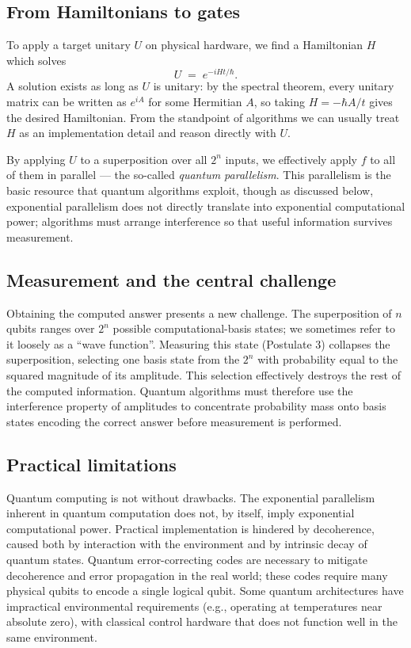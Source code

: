 \subsection{From Hamiltonians to gates}

To apply a target unitary $U$ on physical hardware, we find a Hamiltonian $H$ which solves
\begin{equation}
U \;=\; e^{-iHt/\hbar}.
\label{eq:U-from-H}
\end{equation}
A solution exists as long as $U$ is unitary: by the spectral theorem, every unitary matrix can be written as $e^{iA}$ for some Hermitian $A$, so taking $H = -\hbar A / t$ gives the desired Hamiltonian. From the standpoint of algorithms we can usually treat $H$ as an implementation detail and reason directly with $U$.

By applying $U$ to a superposition over all $2^n$ inputs, we effectively apply $f$ to all of them in parallel --- the so-called \emph{quantum parallelism}. This parallelism is the basic resource that quantum algorithms exploit, though as discussed below, exponential parallelism does not directly translate into exponential computational power; algorithms must arrange interference so that useful information survives measurement.

\subsection{Measurement and the central challenge}

Obtaining the computed answer presents a new challenge. The superposition of $n$ qubits ranges over $2^n$ possible computational-basis states; we sometimes refer to it loosely as a ``wave function''. Measuring this state (Postulate 3) collapses the superposition, selecting one basis state from the $2^n$ with probability equal to the squared magnitude of its amplitude. This selection effectively destroys the rest of the computed information. Quantum algorithms must therefore use the interference property of amplitudes to concentrate probability mass onto basis states encoding the correct answer before measurement is performed.

\subsection{Practical limitations}

Quantum computing is not without drawbacks. The exponential parallelism inherent in quantum computation does not, by itself, imply exponential computational power. Practical implementation is hindered by decoherence, caused both by interaction with the environment and by intrinsic decay of quantum states. Quantum error-correcting codes are necessary to mitigate decoherence and error propagation in the real world; these codes require many physical qubits to encode a single logical qubit. Some quantum architectures have impractical environmental requirements (e.g., operating at temperatures near absolute zero), with classical control hardware that does not function well in the same environment.

